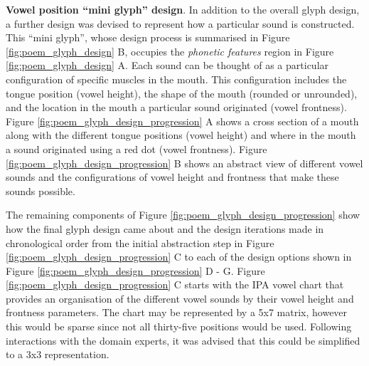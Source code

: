 \textbf{Vowel position ``mini glyph'' design}. In addition to the overall glyph design, a further design was devised to represent how a particular sound is constructed.
This ``mini glyph'', whose design process is summarised in Figure \ref{fig:poem_glyph_design} B, occupies the \emph{phonetic features} region in Figure \ref{fig:poem_glyph_design} A.
Each sound can be thought of as a particular configuration of specific muscles in the mouth.
This configuration includes the tongue position (vowel height), the shape of the mouth (rounded or unrounded), and the location in the mouth a particular sound originated (vowel frontness).
Figure \ref{fig:poem_glyph_design_progression} A shows a cross section of a mouth along with the different tongue positions (vowel height) and where in the mouth a sound originated using a red dot (vowel frontness).
Figure \ref{fig:poem_glyph_design_progression} B shows an abstract view of different vowel sounds and the configurations of vowel height and frontness that make these sounds possible.

The remaining components of Figure \ref{fig:poem_glyph_design_progression} show how the final glyph design came about and the design iterations made in chronological order from the initial abstraction step in Figure \ref{fig:poem_glyph_design_progression} C to each of the design options shown in Figure \ref{fig:poem_glyph_design_progression} D - G.
Figure \ref{fig:poem_glyph_design_progression} C starts with the IPA vowel chart \cite{ipa1999} that provides an organisation of the different vowel sounds by their vowel height and frontness parameters.
The chart may be represented by a 5x7 matrix, however this would be sparse since not all thirty-five positions would be used.
Following interactions with the domain experts, it was advised that this could be simplified to a 3x3 representation.

